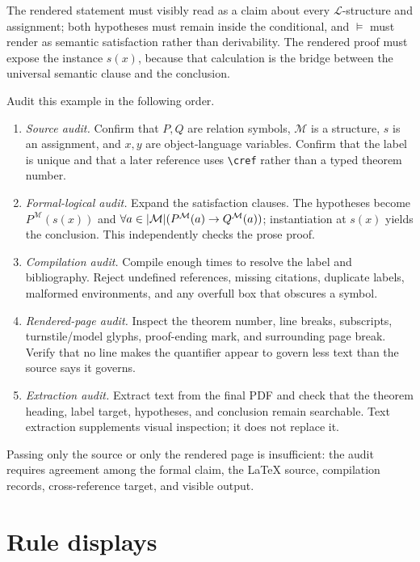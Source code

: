 \documentclass[11pt,oneside,openany]{book}
\theoremstyle{definition}
\theoremstyle{plain}
\theoremstyle{remark}
\DeclarePairedDelimiter{\abs}{\lvert}{\rvert}
\newcommand{\Lang}{\mathcal{L}}
\newcommand{\entails}{\models}
\begin{document}
The rendered statement must visibly read as a claim about every
\(\Lang\)-structure and assignment; both hypotheses must remain inside the
conditional, and \(\entails\) must render as semantic satisfaction rather than
derivability.  The rendered proof must expose the instance \(s(x)\), because
that calculation is the bridge between the universal semantic clause and the
conclusion.

Audit this example in the following order.
\begin{enumerate}
  \item \emph{Source audit.}  Confirm that \(P,Q\) are relation symbols,
        \(\mathcal M\) is a structure, \(s\) is an assignment, and \(x,y\) are
        object-language variables.  Confirm that the label is unique and that
        a later reference uses \verb|\cref| rather than a typed theorem number.
  \item \emph{Formal-logical audit.}  Expand the satisfaction clauses.  The
        hypotheses become \(P^{\mathcal M}(s(x))\) and
        \(\forall a\in\abs{\mathcal M}
        (P^{\mathcal M}(a)\to Q^{\mathcal M}(a))\); instantiation at \(s(x)\)
        yields the conclusion.  This independently checks the prose proof.
  \item \emph{Compilation audit.}  Compile enough times to resolve the label
        and bibliography.  Reject undefined references, missing citations,
        duplicate labels, malformed environments, and any overfull box that
        obscures a symbol.
  \item \emph{Rendered-page audit.}  Inspect the theorem number, line breaks,
        subscripts, turnstile/model glyphs, proof-ending mark, and surrounding
        page break.  Verify that no line makes the quantifier appear to govern
        less text than the source says it governs.
  \item \emph{Extraction audit.}  Extract text from the final PDF and check that
        the theorem heading, label target, hypotheses, and conclusion remain
        searchable.  Text extraction supplements visual inspection; it does
        not replace it.
\end{enumerate}
Passing only the source or only the rendered page is insufficient: the audit
requires agreement among the formal claim, the LaTeX source, compilation
records, cross-reference target, and visible output.

\section{Rule displays}
\label{sec:latex-style-04}
\end{document}
